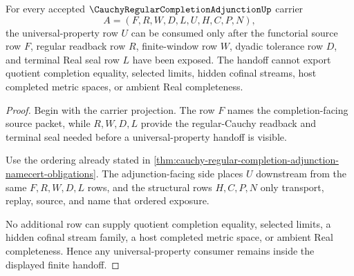 \begin{theorem}
\label{thm:regular-cauchy-completion-adjunction-universal-handoff-nonescape}
For every accepted $\CauchyRegularCompletionAdjunctionUp$ carrier
$$
A=(F,R,W,D,L,U,H,C,P,N),
$$
the universal-property row $U$ can be consumed only after the functorial source row $F$, regular readback row $R$, finite-window row $W$, dyadic tolerance row $D$, and terminal Real seal row $L$ have been exposed. The handoff cannot export quotient completion equality, selected limits, hidden cofinal streams, host completed metric spaces, or ambient Real completeness.
\end{theorem}
\begin{proof}
Begin with the carrier projection. The row $F$ names the completion-facing source packet, while $R,W,D,L$ provide the regular-Cauchy readback and terminal seal needed before a universal-property handoff is visible.

Use the ordering already stated in \autoref{thm:cauchy-regular-completion-adjunction-namecert-obligations}. The adjunction-facing side places $U$ downstream from the same $F,R,W,D,L$ rows, and the structural rows $H,C,P,N$ only transport, replay, source, and name that ordered exposure.

No additional row can supply quotient completion equality, selected limits, a hidden cofinal stream family, a host completed metric space, or ambient Real completeness. Hence any universal-property consumer remains inside the displayed finite handoff.
\end{proof}




